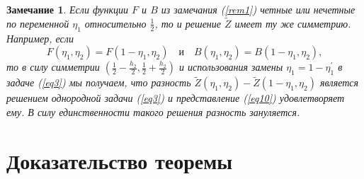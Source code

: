 \documentclass[12pt,titlepage]{report}
\newtheorem{remark}{Замечание}
\begin{document}
	\begin{remark}
		\label{rem2}
		Если функции $F$ и $B$ из замечания (\ref{rem1}) четные или нечетные по переменной $\eta_{1}$ относительно $\frac{1}{2}$, то и решение $\widetilde{Z}$ имеет ту же симметрию. Например, если \\
		$$F\left(\eta_{1}, \eta_{2}\right)=F\left(1-\eta_{1}, \eta_{2}\right) \quad \text {и} \quad B\left(\eta_{1}, \eta_{2}\right)=B\left(1-\eta_{1}, \eta_{2}\right),$$
		то в силу симметрии $\left(\frac{1}{2}-\frac{h_{2}}{2}, \frac{1}{2}+\frac{h_{2}}{2}\right)$ и использования замены $\eta_{1}=1-\eta_{1}^{\prime}$ в задаче (\ref{eq3}) мы получаем, что разность $\tilde{Z}\left(\eta_{1}, \eta_{2}\right)-\widetilde{Z}\left(1-\eta_{1}, \eta_{2}\right)$ является решением однородной задачи (\ref{eq3}) и представление (\ref{eq10}) удовлетворяет ему. В силу единственности такого решения разность зануляется.
	\end{remark}

\newpage
\section{Доказательство теоремы}
\end{document}
